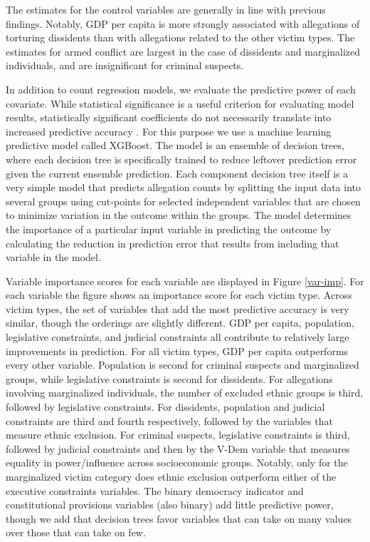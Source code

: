 \documentclass[11pt]{article}
\begin{document}
The estimates for the control variables are generally in line with previous findings. Notably, GDP per capita is more strongly associated with allegations of torturing dissidents than with allegations related to the other victim types. The estimates for armed conflict are largest in the case of dissidents and marginalized individuals, and are insignificant for criminal suspects. 

In addition to count regression models, we evaluate the predictive power of each covariate. While statistical significance is a useful criterion for evaluating model results, statistically significant coefficients do not necessarily translate into increased predictive accuracy \citep{ward2010perils,HillJones2014}. For this purpose we use a machine learning predictive model called XGBoost. The model is an ensemble of decision trees, where each decision tree is specifically trained to reduce leftover prediction error given the current ensemble prediction. Each component decision tree itself is a very simple model that predicts allegation counts by splitting the input data into several groups using cut-points for selected independent variables that are chosen to minimize variation in the outcome within the groups. The model determines the importance of a particular input variable in predicting the outcome by calculating the reduction in prediction error that results from including that variable in the model. 

Variable importance scores for each variable are displayed in Figure \ref{var-imp}. For each variable the figure shows an importance score for each victim type. Across victim types, the set of variables that add the most predictive accuracy is very similar, though the orderings are slightly different. GDP per capita, population, legislative constraints, and judicial constraints all contribute to relatively large improvements in prediction. For all victim types, GDP per capita outperforms every other variable. Population is second for criminal suspects and marginalized groups, while legislative constraints is second for dissidents. For allegations involving marginalized individuals, the number of excluded ethnic groups is third, followed by legislative constraints. For dissidents, population and judicial constraints are third and fourth respectively, followed by the variables that measure ethnic exclusion. For criminal suspects, legislative constraints is third, followed by judicial constraints and then by the V-Dem variable that measures equality in power/influence across socioeconomic groups. Notably, only for the marginalized victim category does ethnic exclusion outperform either of the executive constraints variables. The binary democracy indicator and constitutional provisions variables (also binary) add little predictive power, though we add that decision trees favor variables that can take on many values over those that can take on few. 
\end{document}
